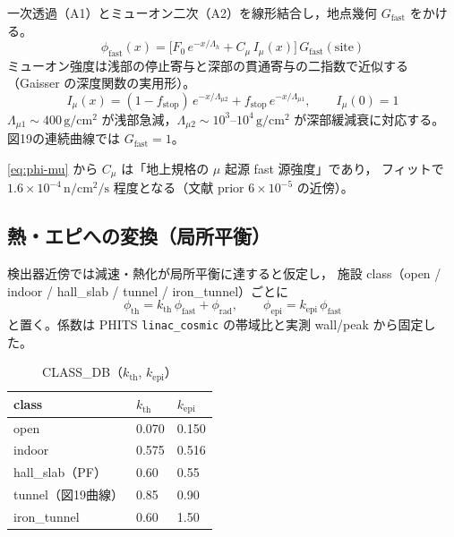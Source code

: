 \documentclass[a4paper,11pt]{ltjsarticle}
\begin{document}
一次透過（A1）とミューオン二次（A2）を線形結合し，地点幾何 $G_{\mathrm{fast}}$ をかける\cite{S1,S2}。
\begin{equation}
  \phi_{\mathrm{fast}}(x)
  = \bigl[ F_0\,e^{-x/\Lambda_h} + C_\mu\,I_\mu(x) \bigr]
    \,G_{\mathrm{fast}}(\mathrm{site})
  \label{eq:fast}
\end{equation}
ミューオン強度は浅部の停止寄与と深部の貫通寄与の二指数で近似する（Gaisser の深度関数の実用形\cite{Gaisser2016,S1}）。
\begin{equation}
  I_\mu(x)
  = (1-f_{\mathrm{stop}})\,e^{-x/\Lambda_{\mu 2}}
    + f_{\mathrm{stop}}\,e^{-x/\Lambda_{\mu 1}},
  \qquad I_\mu(0)=1
  \label{eq:imu}
\end{equation}
$\Lambda_{\mu 1}\sim400\,\mathrm{g/cm^2}$ が浅部急減，$\Lambda_{\mu 2}\sim10^{3}$--$10^{4}\,\mathrm{g/cm^2}$ が深部緩減衰に対応する。
図19の連続曲線では $G_{\mathrm{fast}}=1$。

\eqref{eq:phi-mu} から $C_\mu$ は「地上規格の $\mu$ 起源 fast 源強度」であり，
フィットで $1.6\times10^{-4}\,\mathrm{n/cm^2/s}$ 程度となる（文献 prior $6\times10^{-5}$ の近傍\cite{S1}）。

\subsection{熱・エピへの変換（局所平衡）}

検出器近傍では減速・熱化が局所平衡に達すると仮定し，
施設 class（open / indoor / hall\_slab / tunnel / iron\_tunnel）ごとに
\begin{equation}
  \phi_{\mathrm{th}}
  = k_{\mathrm{th}}\,\phi_{\mathrm{fast}} + \phi_{\mathrm{rad}},
  \qquad
  \phi_{\mathrm{epi}}
  = k_{\mathrm{epi}}\,\phi_{\mathrm{fast}}
  \label{eq:th-epi}
\end{equation}
と置く\cite{S1,S3}。係数は PHITS \texttt{linac\_cosmic} の帯域比と実測 wall/peak から固定した。

\begin{table}[htbp]
  \centering
  \caption{CLASS\_DB（$k_{\mathrm{th}}$, $k_{\mathrm{epi}}$）\cite{S3}}
  \begin{tabular}{lll}
    \toprule
    class & $k_{\mathrm{th}}$ & $k_{\mathrm{epi}}$ \\
    \midrule
    open & 0.070 & 0.150 \\
    indoor & 0.575 & 0.516 \\
    hall\_slab（PF） & 0.60 & 0.55 \\
    tunnel（図19曲線） & 0.85 & 0.90 \\
    iron\_tunnel & 0.60 & 1.50 \\
    \bottomrule
  \end{tabular}
\end{table}
\end{document}

